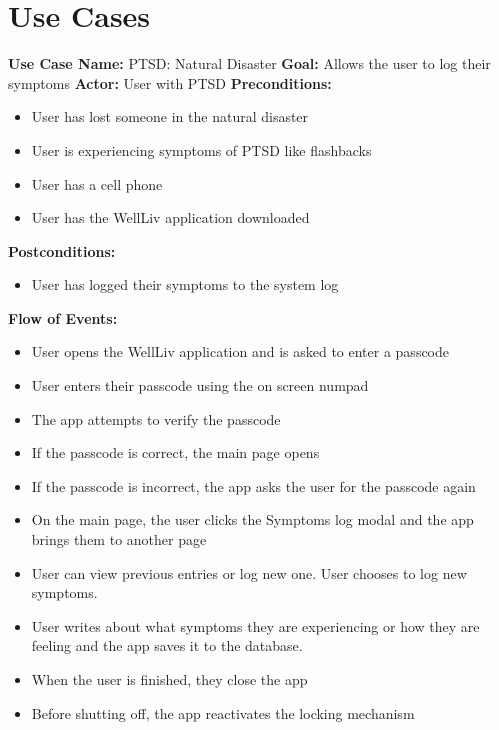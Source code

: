 \documentclass[letterpaper,12pt,titlepage]{article}
\begin{document}
\section{Use Cases}
\textbf{Use Case Name:} PTSD: Natural Disaster
\newline
\newline
\textbf{Goal:} Allows the user to log their symptoms
\newline
\newline
\textbf{Actor:} User with PTSD
\newline
\newline
\textbf{Preconditions:}
\begin{itemize}
\item User has lost someone in the natural disaster
\item User is experiencing symptoms of PTSD like flashbacks
\item User has a cell phone
\item User has the WellLiv application downloaded
\end{itemize}
\textbf{Postconditions:}
\begin{itemize}
\item User has logged their symptoms to the system log
\end{itemize}
\textbf{Flow of Events:}
\begin{itemize}
\item User opens the WellLiv application and is asked to enter a passcode
\item User enters their passcode using the on screen numpad
\item The app attempts to verify the passcode
\item If the passcode is correct, the main page opens
\item If the passcode is incorrect, the app asks the user for the passcode again
\item On the main page, the user clicks the Symptoms log modal and the app brings them to another page
\item User can view previous entries or log new one. User chooses to log new symptoms.
\item User writes about what symptoms they are experiencing or how they are feeling and the app saves it to the database.
\item When the user is finished, they close the app
\item Before shutting off, the app reactivates the locking mechanism
\end{itemize}
\end{document}
